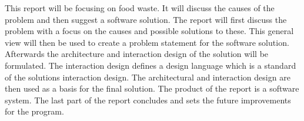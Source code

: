 This report will be focusing on food waste.
It will discuss the causes of the problem and then suggest a software solution.
The report will first discuss the problem with a focus on the causes and possible solutions to these.
This general view will then be used to create a problem statement for the software solution.
Afterwards the architecture and interaction design of the solution will be formulated.
The interaction design defines a design language which is a standard of the solutions interaction design.
The architectural and interaction design are then used as a basis for the final solution.
The product of the report is a software system.
The last part of the report concludes and sets the future improvements for the program. 
